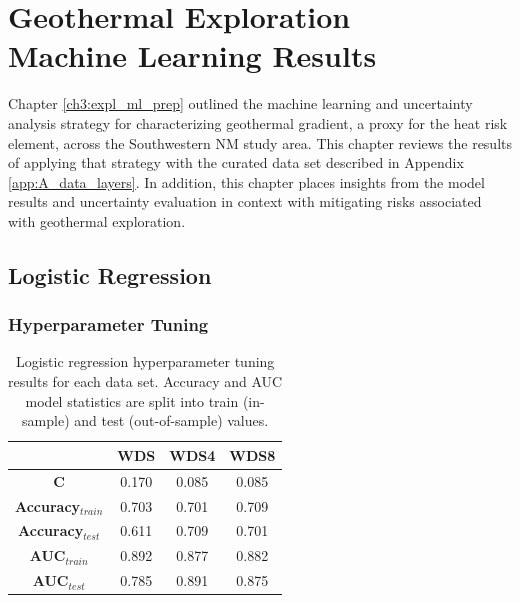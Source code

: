 \chapter{Geothermal Exploration\\Machine Learning Results}\label{ch5:ml_results}
Chapter \ref{ch3:expl_ml_prep} outlined the machine learning and uncertainty analysis strategy for characterizing geothermal gradient, a proxy for the heat risk element, across the Southwestern NM study area. This chapter reviews the results of applying that strategy with the curated data set described in Appendix \ref{app:A_data_layers}. In addition, this chapter places insights from the model results and uncertainty evaluation in context with mitigating risks associated with geothermal exploration.

\section{Logistic Regression} \label{ch5:lr_model}
\subsection{Hyperparameter Tuning} \label{ch5:lr_tuning}
\begin{table}
\centering
\begin{tabular}{c|c|c|c|}
\cline{2-4}
                                 & \textbf{WDS}   & \textbf{WDS4}  & \textbf{WDS8}  \\ \hline
\multicolumn{1}{|c|}{\textbf{C}}          & 0.170 & 0.085 & 0.085 \\ \hline
\multicolumn{1}{|c|}{\textbf{Accuracy$_{train}$}} & 0.703 & 0.701 & 0.709 \\ \hline
\multicolumn{1}{|c|}{\textbf{Accuracy$_{test}$}}  & 0.611 & 0.709 & 0.701 \\ \hline
\multicolumn{1}{|c|}{\textbf{AUC$_{train}$}} & 0.892 & 0.877 & 0.882 \\ \hline
\multicolumn{1}{|c|}{\textbf{AUC$_{test}$}}  & 0.785 & 0.891 & 0.875 \\ \hline
\end{tabular}
\singlespacing
\caption[Logistic regression hyperparameter tuning results]{Logistic regression hyperparameter tuning results for each data set. Accuracy and AUC model statistics are split into train (in-sample) and test (out-of-sample) values.}
\label{tab:logreg_tuning}
\end{table}


